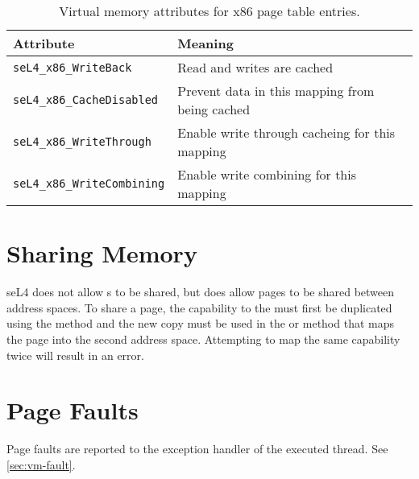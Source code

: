 \begin{table}[htb]
  \begin{center}
    \begin{tabularx}{\textwidth}{p{}X}
      \toprule
      Attribute & Meaning \\
      \midrule
      \texttt{seL4\_x86\_WriteBack} & Read and writes are cached \\
      \texttt{seL4\_x86\_CacheDisabled} & Prevent data in this mapping
      from being cached \\
      \texttt{seL4\_x86\_WriteThrough} & Enable write through cacheing for this mapping \\
      \texttt{seL4\_x86\_WriteCombining} & Enable write combining for this mapping \\
      \bottomrule
    \end{tabularx}
    \caption{\label{tbl:vmattr_ia32} Virtual memory attributes for x86 page
      table entries.}
  \end{center}
\end{table}

\section{Sharing Memory}

seL4 does not allow s to be shared, but does allow
pages to be shared between address spaces.
To share a page, the capability to the
 must first be
duplicated using the  method and the new copy must
be used in the  \ifxeightsix or  \fi method that maps the page into the second
address space. Attempting to map the same capability
twice will result in an error.


\section{Page Faults}

Page faults are reported to the exception handler of the executed thread.
See \autoref{sec:vm-fault}.
